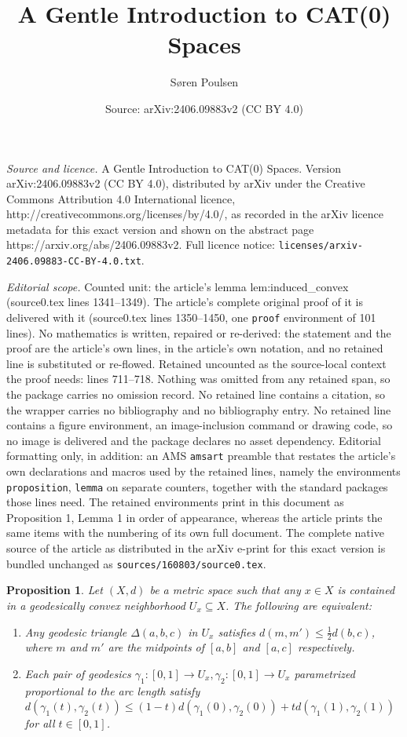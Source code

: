 \documentclass[10pt,a4paper]{amsart}
\title{A Gentle Introduction to CAT(0) Spaces}
\author{S{\o}ren Poulsen}
\date{Source: arXiv:2406.09883v2 (CC BY 4.0)}
\newtheorem{proposition}{Proposition}
\newcommand{\parenum}{\setenumerate[1]{label=\textbf{(\arabic*)}}}
\begin{document}
\maketitle

\noindent\emph{Source and licence.} A Gentle Introduction to CAT(0) Spaces. Version arXiv:2406.09883v2 (CC BY 4.0), distributed by arXiv under the Creative Commons Attribution 4.0 International licence, http://creativecommons.org/licenses/by/4.0/, as recorded in the arXiv licence metadata for this exact version and shown on the abstract page https://arxiv.org/abs/2406.09883v2. Full licence notice: \texttt{licenses/arxiv-2406.09883-CC-BY-4.0.txt}.\par\smallskip

\noindent\textit{Editorial scope.} Counted unit: the article's lemma lem:induced\_convex (source0.tex lines 1341--1349). The article's complete original proof of it is delivered with it (source0.tex lines 1350--1450, one \texttt{proof} environment of 101 lines). No mathematics is written, repaired or re-derived: the statement and the proof are the article's own lines, in the article's own notation, and no retained line is substituted or re-flowed.  Retained uncounted as the source-local context the proof needs: lines 711--718.  Nothing was omitted from any retained span, so the package carries no omission record.  No retained line contains a citation, so the wrapper carries no bibliography and no bibliography entry.  No retained line contains a figure environment, an image-inclusion command or drawing code, so no image is delivered and the package declares no asset dependency.  Editorial formatting only, in addition: an AMS \texttt{amsart} preamble that restates the article's own declarations and macros used by the retained lines, namely the environments \texttt{proposition}, \texttt{lemma} on separate counters, together with the standard packages those lines need.  The retained environments print in this document as Proposition 1, Lemma 1 in order of appearance, whereas the article prints the same items with the numbering of its own full document.  The complete native source of the article as distributed in the arXiv e-print for this exact version is bundled unchanged as \texttt{sources/160803/source0.tex}.
\begin{proposition}\label{prop:conv_mid}
Let \((X,d)\) be a metric space such that any \(x\in X\) is contained in a geodesically convex neighborhood \(U_x\subseteq X\). The following are equivalent:
\parenum
\begin{enumerate}
    \item Any geodesic triangle \(\Delta(a,b,c)\) in \(U_x\) satisfies \(d(m,m')\leq\frac{1}{2}d(b,c)\), where \(m\) and \(m'\) are the midpoints of \([a,b]\) and \([a,c]\) respectively.
    \item Each pair of geodesics \(\gamma_1:[0,1]\to U_x,\gamma_2:[0,1]\to U_x\) parametrized proportional to the arc length satisfy \(d(\gamma_1(t),\gamma_2(t))\leq (1-t)d(\gamma_1(0),\gamma_2(0))+td(\gamma_1(1),\gamma_2(1))\) for all \(t\in[0,1]\).
\end{enumerate}
\end{proposition}
\end{document}
